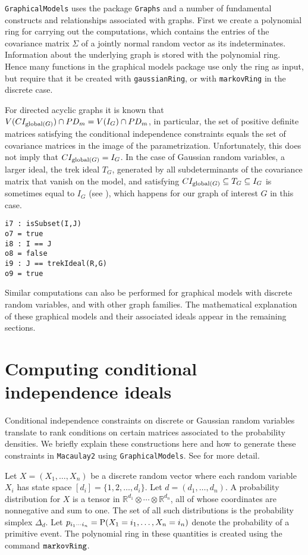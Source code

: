 \documentclass[letterpaper]{article}
\theoremstyle{plain}
\theoremstyle{definition}
\begin{document}
 {\tt GraphicalModels} uses the package {\tt Graphs} and a number of fundamental constructs and relationships 
associated with graphs.  First we create a polynomial ring
for carrying out the computations, which contains the entries of
the covariance matrix $\Sigma$ of a jointly normal random vector
as its indeterminates.  Information about the underlying graph is stored with the polynomial ring. 
Hence many functions in the graphical models package use only the ring as input, but require that it be created with {\tt gaussianRing}, or with {\tt markovRing} in the discrete case.

For directed acyclic graphs it is known that 
$V(CI_{{\rm global}(G)}) \cap PD_{m}  =  
V(I_{G}) \cap PD_{m}$,
in particular, the set of positive definite matrices
satisfying the conditional independence constraints equals the set of covariance matrices in the image of the parametrization.
Unfortunately, this does not imply that $CI_{{\rm global}(G)} 
=I_{G}$.  In the case of Gaussian random variables, a larger ideal,
the trek ideal $T_{G}$, generated by all subdeterminants of the 
covariance matrix that vanish on the model, and satisfying
$CI_{{\rm global}(G)} \subseteq T_{G} \subseteq
I_{G}$ is sometimes equal to $I_{G}$ (see \cite{STD}), which happens for our
graph of interest $G$ in this case.

\begin{verbatim}
i7 : isSubset(I,J)
o7 = true
i8 : I == J
o8 = false
i9 : J == trekIdeal(R,G)
o9 = true
\end{verbatim}

Similar computations can also be performed for graphical models
with discrete random variables,
and with other graph families.  The mathematical explanation of
these graphical models and their associated ideals
appear in the remaining sections.


\section{Computing conditional independence ideals}\label{CI}

Conditional independence constraints on discrete or Gaussian random variables
 translate to rank conditions on certain matrices
associated to the probability densities.  We briefly explain
these constructions here and how to generate these constraints
in {\tt Macaulay2} using {\tt GraphicalModels}. See \cite[Ch.~3]{DSS}
for more detail.

Let $X = (X_{1}, \ldots, X_{n})$ be a discrete random
vector where each random variable $X_{i}$ has state space
$[d_{i}] = \{1,2, \ldots, d_{i} \}$. Let $d = (d_{1}, \ldots, d_{n})$.  
A probability distribution
for $X$ is a tensor in $\mathbb{R}^{d_{1}}\otimes \cdots \otimes
\mathbb{R}^{d_{n}}$, all of whose 
coordinates are nonnegative and sum to one.
The set of all such distributions is the probability simplex $\Delta_{d}$.
Let $p_{i_{1}\cdots i_{n}} = {\rm P}(X_{1} = i_{1}, \ldots, X_{n} = i_{n})$
denote the probability of a primitive event.  The polynomial
ring in these quantities is created using the command ${\tt markovRing}$.
\end{document}
